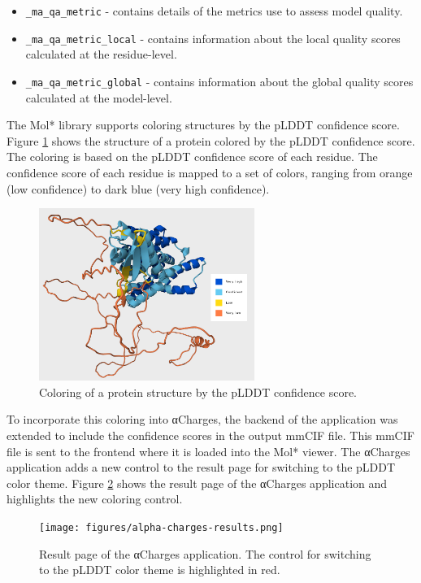 \documentclass[
  digital,     %
  oneside,     %
  nosansbold,  %
  nocolorbold, %
  lof,         %
  lot,         %
]{fithesis4}
\begin{document}
\begin{itemize}
  \item \texttt{\_ma\_qa\_metric} - contains details of the metrics use to assess model quality.
  \item \texttt{\_ma\_qa\_metric\_local} - contains information about the local quality scores calculated at the residue-level.
  \item \texttt{\_ma\_qa\_metric\_global} - contains information about the global quality scores calculated at the model-level.
\end{itemize}

The Mol* library supports coloring structures by the pLDDT confidence score. Figure \ref{fig:alphafold-coloring} shows the structure of a protein colored by the pLDDT confidence score. The coloring is based on the pLDDT confidence score of each residue. The confidence score of each residue is mapped to a set of colors, ranging from orange (low confidence) to dark blue (very high confidence).

\begin{figure}[htbp]
  \begin{center}
    \includegraphics[width=7cm]{figures/alphafold_coloring.png}
  \end{center}
  \caption{Coloring of a protein structure by the pLDDT confidence score.}
  \label{fig:alphafold-coloring}
\end{figure}

To incorporate this coloring into αCharges, the backend of the application was extended to include the confidence scores in the output mmCIF file. This mmCIF file is sent to the frontend where it is loaded into the Mol* viewer. The αCharges application adds a new control to the result page for switching to the pLDDT color theme. Figure \ref{fig:alpha-charges-results} shows the result page of the αCharges application and highlights the new coloring control.

\begin{figure}[htbp]
  \begin{center}
    \texttt{[image: figures/alpha-charges-results.png]}
  \end{center}
  \caption[Result page of the αCharges application.]{Result page of the αCharges application. The control for switching to the pLDDT color theme is highlighted in red.}
  \label{fig:alpha-charges-results}
\end{figure}
\end{document}
